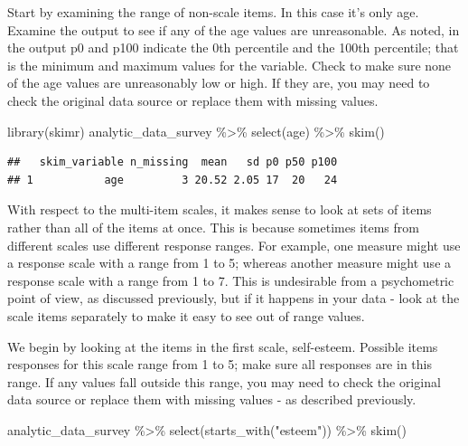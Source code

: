 \documentclass[
]{krantz}
\makeatletter
\newenvironment{Shaded}{\begin{snugshade}}{\end{snugshade}}
\newcommand{\FunctionTok}[1]{\textcolor[rgb]{0,0,0}{#1}}
\newcommand{\NormalTok}[1]{#1}
\newcommand{\SpecialCharTok}[1]{\textcolor[rgb]{0,0,0}{#1}}
\newcommand{\StringTok}[1]{\textcolor[rgb]{0.5,0.5,0.5}{#1}}
\newenvironment{kframe}{%
\medskip{}
\setlength{\fboxsep}{.8em}
 \def\at@end@of@kframe{}%
 \ifinner\ifhmode%
  \def\at@end@of@kframe{\end{minipage}}%
  \begin{minipage}{\columnwidth}%
 \fi\fi%
 \def\FrameCommand##1{\hskip\@totalleftmargin \hskip-\fboxsep
 \colorbox{shadecolor}{##1}\hskip-\fboxsep
     \hskip-\linewidth \hskip-\@totalleftmargin \hskip\columnwidth}%
 \MakeFramed {\advance\hsize-\width
   \@totalleftmargin\z@ \linewidth\hsize
   \@setminipage}}%
 {\par\unskip\endMakeFramed%
 \at@end@of@kframe}
\renewenvironment{Shaded}{\begin{kframe}}{\end{kframe}}
\makeatother
\begin{document}
Start by examining the range of non-scale items. In this case it's only age. Examine the output to see if any of the age values are unreasonable. As noted, in the output p0 and p100 indicate the 0th percentile and the 100th percentile; that is the minimum and maximum values for the variable. Check to make sure none of the age values are unreasonably low or high. If they are, you may need to check the original data source or replace them with missing values.

\begin{Shaded}
\begin{Highlighting}[]
\FunctionTok{library}\NormalTok{(skimr)}
\NormalTok{analytic\_data\_survey }\SpecialCharTok{\%\textgreater{}\%}
  \FunctionTok{select}\NormalTok{(age) }\SpecialCharTok{\%\textgreater{}\%}
  \FunctionTok{skim}\NormalTok{()}
\end{Highlighting}
\end{Shaded}

\begin{verbatim}
##   skim_variable n_missing  mean   sd p0 p50 p100
## 1           age         3 20.52 2.05 17  20   24
\end{verbatim}

With respect to the multi-item scales, it makes sense to look at sets of items rather than all of the items at once. This is because sometimes items from different scales use different response ranges. For example, one measure might use a response scale with a range from 1 to 5; whereas another measure might use a response scale with a range from 1 to 7. This is undesirable from a psychometric point of view, as discussed previously, but if it happens in your data - look at the scale items separately to make it easy to see out of range values.

We begin by looking at the items in the first scale, self-esteem. Possible items responses for this scale range from 1 to 5; make sure all responses are in this range. If any values fall outside this range, you may need to check the original data source or replace them with missing values - as described previously.

\begin{Shaded}
\begin{Highlighting}[]
\NormalTok{analytic\_data\_survey }\SpecialCharTok{\%\textgreater{}\%}
  \FunctionTok{select}\NormalTok{(}\FunctionTok{starts\_with}\NormalTok{(}\StringTok{"esteem"}\NormalTok{)) }\SpecialCharTok{\%\textgreater{}\%}
  \FunctionTok{skim}\NormalTok{()}
\end{Highlighting}
\end{Shaded}
\end{document}
